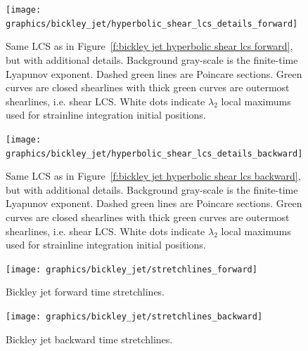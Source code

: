 \documentclass{article}
\begin{document}
\begin{figure}
\begin{center}
\texttt{[image: graphics/bickley\_jet/hyperbolic\_shear\_lcs\_details\_forward]}
\end{center}
\caption{Same LCS as in Figure~\ref{f:bickley jet hyperbolic shear lcs forward}, but with additional details. Background gray-scale is the finite-time Lyapunov exponent. Dashed green lines are Poincare sections. Green curves are closed shearlines with thick green curves are outermost shearlines, i.e. shear LCS. White dots indicate $\lambda_2$ local maximums used for strainline integration initial positions.}
\label{f:bickley jet hyperbolic shear lcs details forward}
\end{figure}

\begin{figure}
\begin{center}
\texttt{[image: graphics/bickley\_jet/hyperbolic\_shear\_lcs\_details\_backward]}
\end{center}
\caption{Same LCS as in Figure~\ref{f:bickley jet hyperbolic shear lcs backward}, but with additional details. Background gray-scale is the finite-time Lyapunov exponent. Dashed green lines are Poincare sections. Green curves are closed shearlines with thick green curves are outermost shearlines, i.e. shear LCS. White dots indicate $\lambda_2$ local maximums used for strainline integration initial positions.}
\label{f:bickley jet hyperbolic shear lcs details backward}
\end{figure}

\begin{figure}
\begin{center}
\texttt{[image: graphics/bickley\_jet/stretchlines\_forward]}
\end{center}
\caption{Bickley jet forward time stretchlines.}
\label{f:bickley jet forward stretchlines}
\end{figure}

\begin{figure}
\begin{center}
\texttt{[image: graphics/bickley\_jet/stretchlines\_backward]}
\end{center}
\caption{Bickley jet backward time stretchlines.}
\label{f:bickley jet backward stretchlines}
\end{figure}
\end{document}
